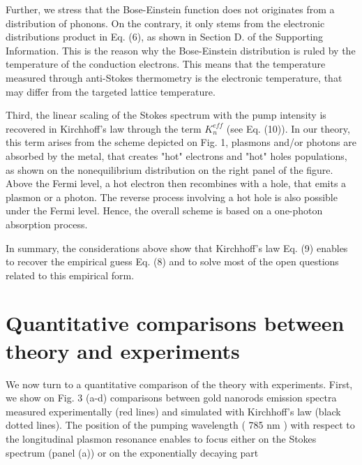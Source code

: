\documentclass[10pt]{article}
\begin{document}
Further, we stress that the Bose-Einstein function does not originates from a distribution of phonons. On the contrary, it only stems from the electronic distributions product in Eq. (6), as shown in Section D. of the Supporting Information. This is the reason why the Bose-Einstein distribution is ruled by the temperature of the conduction electrons. This means that the temperature measured through anti-Stokes thermometry is the electronic temperature, that may differ from the targeted lattice temperature.

Third, the linear scaling of the Stokes spectrum with the pump intensity is recovered in Kirchhoff's law through the term $K_{n}^{e f f}$ (see Eq. (10)). In our theory, this term arises from the scheme depicted on Fig. 1, plasmons and/or photons are absorbed by the metal, that creates "hot" electrons and "hot" holes populations, as shown on the nonequilibrium distribution on the right panel of the figure. Above the Fermi level, a hot electron then recombines with a hole, that emits a plasmon or a photon. The reverse process involving a hot hole is also possible under the Fermi level. Hence, the overall scheme is based on a one-photon absorption process.

In summary, the considerations above show that Kirchhoff's law Eq. (9) enables to recover the empirical guess Eq. (8) and to solve most of the open questions related to this empirical form.

\section*{Quantitative comparisons between theory and experiments}
We now turn to a quantitative comparison of the theory with experiments. First, we show on Fig. 3 (a-d) comparisons between gold nanorods emission spectra measured experimentally (red lines) and simulated with Kirchhoff's law (black dotted lines). The position of the pumping wavelength ( 785 nm ) with respect to the longitudinal plasmon resonance enables to focus either on the Stokes spectrum (panel (a)) or on the exponentially decaying part
\end{document}
